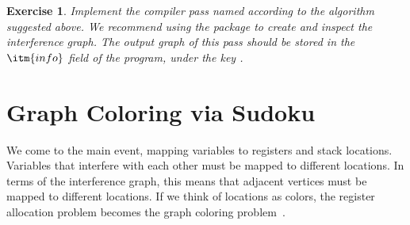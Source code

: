 \documentclass[11pt]{book}
\newcommand{\margincomment}[1]{\marginpar{\color{comment-red}\tiny #1}}
\newcommand{\margincomment}[1]{}
\newtheorem{exercise}[theorem]{Exercise}
\begin{document}

\begin{exercise}\normalfont
Implement the compiler pass named  according
to the algorithm suggested above. We recommend using the 
package to create and inspect the interference graph.  The output
graph of this pass should be stored in the $\itm{info}$ field of the
program, under the key .
\end{exercise}

  
\section{Graph Coloring via Sudoku}
\label{sec:graph-coloring}

We come to the main event, mapping variables to registers and stack
locations. Variables that interfere with each other must be mapped to
different locations.  In terms of the interference graph, this means
that adjacent vertices must be mapped to different locations.  If we
think of locations as colors, the register allocation problem becomes
the graph coloring problem~\citep{Balakrishnan:1996ve,Rosen:2002bh}.
\end{document}
